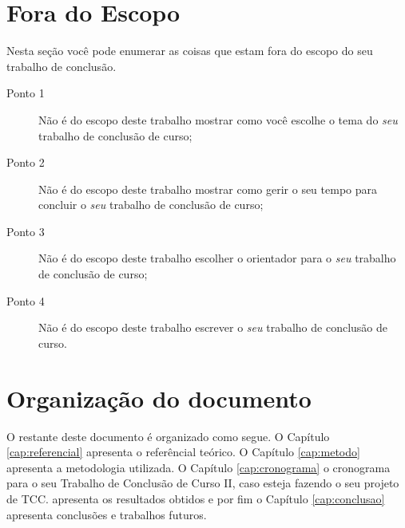 \section{Fora do Escopo}
Nesta seção você pode enumerar as coisas que estam fora do escopo do seu trabalho de conclusão.
\begin{description}
	\item[Ponto 1] Não é do escopo deste trabalho mostrar como você escolhe o tema do \emph{seu}  trabalho de conclusão de curso;
	\item[Ponto 2 ]  Não é do escopo deste trabalho mostrar como gerir o seu tempo para concluir o \emph{seu}  trabalho de conclusão de curso; 
	\item[Ponto 3] Não é do escopo deste trabalho escolher o orientador para o \emph{seu}  trabalho de conclusão de curso; 
	\item[Ponto 4] Não é do escopo deste trabalho escrever o \emph{seu}  trabalho de conclusão de curso.
\end{description}

\section{Organização do documento}

O restante deste documento é organizado como segue. O Capítulo \ref{cap:referencial} apresenta o referêncial teórico. O Capítulo \ref{cap:metodo} apresenta a metodologia utilizada. O Capítulo \ref{cap:cronograma} o cronograma para o seu Trabalho de Conclusão de Curso II, caso esteja fazendo o seu projeto de TCC. apresenta os resultados obtidos e por fim o Capítulo \ref{cap:conclusao} apresenta conclusões e trabalhos futuros.